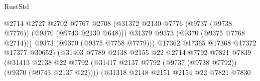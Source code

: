 \begin{lexlean}{RustStd}
\begin{coremodule}
                                                  @2714
                                                  @2727
                                                  @2702
                                                  @7767
                                                  @2708
                                                  (@31372
                                                    @2130
                                                    @7776
                                                    (@9737 (@9738 @7776))
                                                    (@9370 (@9743 @2130 @648)))
                                                  @31379
                                                  @9373
                                                  (@9370 (@9375 @7768 @2714)))
                                                @9373
                                                (@9370 (@9375 @7758 @7779)))
                                              @17362
                                              @17365
                                              @17368
                                              @17372
                                              @17377
                                              @30652)
                                            (@31403
                                              @7789
                                              @2138
                                              @2155
                                              @22
                                              @2714
                                              @7792
                                              @7821
                                              @7839
                                              (@31413
                                                @2138
                                                @22
                                                @7792
                                                (@31417
                                                  @2137
                                                  @7792
                                                  (@9737 (@9738 @7792))
                                                  (@9370 (@9743 @2137 @22))))
                                              (@31318
                                                @2148
                                                @2151
                                                @2154
                                                @22
                                                @7821
                                                @7830

\end{coremodule}
\end{lexlean}
